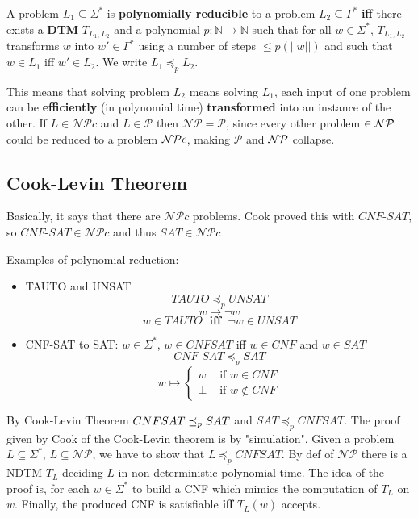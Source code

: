 	\begin{definition}
	A problem $L_1 \subseteq \Sigma^\ast$ is \textbf{polynomially reducible} to a problem $L_2 \subseteq \Gamma^\ast$ \textbf{iff} there exists a \textbf{DTM} $T_{L_1, L_2}$ and a polynomial $p : \mathbb{N} \rightarrow \mathbb{N}$ such that for all $w \in \Sigma^\ast$, $T_{L_1, L_2}$ transforms $w$ into $w' \in \Gamma^\ast$ using a number of steps $\leq p (||w||)$ and such that $w \in L_1$ iff $w' \in L_2$. We write $L_1 \preceq_p L_2$.
	\end{definition}
	This means that solving problem $L_2$ means solving $L_1$, each input of one problem can be \textbf{efficiently} (in polynomial time) \textbf{transformed} into an instance of the other. If $L \in \mathcal{NP}c$ and $L \in \mathcal{P}$ then $\mathcal{NP} = \mathcal{P}$, since every other problem $\in \mathcal{NP}$ could be reduced to a problem $\mathcal{NP} c$, making $\mathcal{P}$ and $\mathcal{NP}$ collapse.

	\subsection{Cook-Levin Theorem}

	Basically, it says that there are $\mathcal{NP}c$ problems. Cook proved this with $CNF$-$SAT$, so $CNF$-$SAT \in \mathcal{NP}c$ and thus $SAT \in \mathcal{NP}c$
	\noindent
	\begin{example}
	Examples of polynomial reduction:
	\begin{itemize}
		\item TAUTO and UNSAT
		$$ TAUTO \preceq_p UNSAT $$
		$$ w \mapsto \neg w $$
		$$ w \in TAUTO \; \textbf{ iff } \; \neg w \in UNSAT $$

		\item CNF-SAT to SAT: $w \in \Sigma^\ast$, $w \in CNFSAT$ iff $w \in CNF$ and $w \in SAT$
		$$ CNF\text{-}SAT \preceq_p SAT $$
		$$ w \mapsto \begin{cases}
			w & \text{ if } w \in CNF \\
			\bot & \text{ if } w \notin CNF
		\end{cases}$$
		\nn
	\end{itemize}
	\end{example}
	\vspace{-0.75cm}
	\noindent
	By Cook-Levin Theorem $CNFSAT \preceq_p SAT$ and $SAT \preceq_p CNFSAT$. The proof given by Cook of the Cook-Levin theorem is by "simulation". Given a problem $L \subseteq \Sigma^\ast$, $L \subseteq \mathcal{NP}$, we have to show that $L \preceq_p CNFSAT$. By def of $\mathcal{NP}$ there is a NDTM $T_L$ deciding $L$ in non-deterministic polynomial time. The idea of the proof is, for each $w \in \Sigma^\ast$ to build a CNF which mimics the computation of $T_L$ on $w$. Finally, the produced CNF is satisfiable \textbf{iff} $T_L (w)$ accepts.


